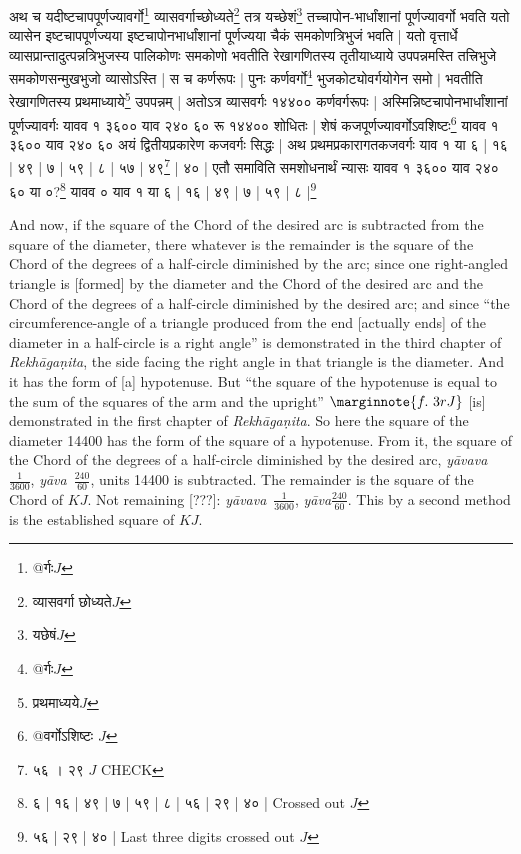 \documentclass[12pt]{book}
\let\*=\d
\def\RG{\textit{Rekh\=a\-ga\*ni\-ta}}
\def\yava{\textit{y\=ava}}
\def\yavava{\textit{y\=avava}}
\begin{document}
\newpage

{\s अथ च यदीष्टचापपूर्णज्यावर्गो\footnote{{\s @र्गः}$J$} व्यासवर्गाच्छोध्यते\footnote{{\s व्यासवर्गा छोध्यते}$J$} तत्र यच्छेशं\footnote{{\s यछेषं}$J$} तच्चापोन-भार्धांशानां पूर्णज्यावर्गो भवति
यतो व्यासेन इष्टचापपूर्णज्यया
इष्टचापोनभार्धांशानां पूर्णज्यया चैकं समकोणत्रिभुजं भवति |
यतो वृत्तार्धे
व्यासप्रान्तादुत्पन्नत्रिभुजस्य पालिकोणः समकोणो भवतीति रेखागणितस्य तृतीयाध्याये उपपन्नमस्ति
तत्त्रिभुजे समकोणसन्मुखभुजो व्यासोऽस्ति | स च कर्णरूपः | पुनः
कर्णवर्गो\footnote{{\s @र्गः}$J$} भुजकोट्योवर्गयोगेन समो $|$ भवतीति रेखागणितस्य
प्रथमाध्याये\footnote{{\s प्रथमाध्यये}$J$} उपपन्नम् | अतोऽत्र व्यासवर्गः १४४०० कर्णवर्गरूपः |
अस्मिन्निष्टचापोन\-भार्धांशानां पूर्णज्यावर्गः यावव १ ३६०० याव २४० ६० रू १४४०० शोधितः | शेषं कजपूर्णज्यावर्गोऽवशिष्टः\footnote{{\s @वर्गोऽशिष्टः} $J$} यावव १ ३६०० याव २४० ६०
अयं द्वितीयप्रकारेण कजवर्गः सिद्धः | अथ प्रथमप्रकारागतकजवर्गः याव १ या ६ | १६ | ४९ | ७ | ५९ | ८ | ५७ | ४९\footnote{{\s ५६ । २९} $J$ CHECK} | ४० |
एतौ समाविति समशोधनार्थं न्यासः यावव १ ३६०० याव २४० ६०
या ०?\footnote{{\s ६ | १६ | ४९ | ७ | ५९ | ८ | ५६ | २९ | ४० |} Crossed out $J$}
यावव ० याव १ या
६ | १६ | ४९ | ७ | ५९ | ८ |\footnote{ {\s ५६ | २९ | ४० |}  Last three digits crossed out $J$}}

\newpage

And now, if the square of the Chord of the desired arc is subtracted from the 
square of the diameter, there whatever is the remainder is the square of 
the Chord of the degrees of a half-circle diminished by the arc; since one
right-angled triangle is [formed] by the diameter and the Chord of the 
desired arc and the Chord of the degrees of a half-circle diminished by the
desired arc; and since ``the circumference-angle 
of a triangle produced from the end [actually ends]
of the diameter in a half-circle is a 
right angle'' is demonstrated in the third chapter of \RG,
the side facing the right angle in that triangle is the diameter. And it 
has the form of [a] hypotenuse. But ``the square of  the hypotenuse
is equal to the sum of the squares of the arm and the upright''
$\marginnote{f.~3r J}$ [is] demonstrated in the first chapter  of \RG. So here the square of the diameter
14400 has the form of the square of a hypotenuse. From it, the square of the 
Chord of the degrees of a half-circle diminished by the desired arc,
\yavava\ $\frac{1}{3600}$, \yava\ $\frac{240}{60}$, units 14400 is subtracted.
The remainder is the square of the Chord of $KJ$. Not remaining [???]: 
\yavava\ $\frac{1}{3600}$, \yava $\frac{240}{60}$. This by a second method
is the established square of $KJ$.
\end{document}
